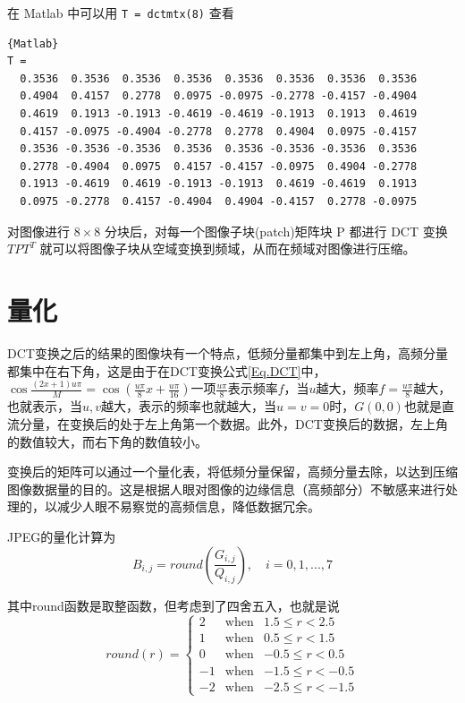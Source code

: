 在 Matlab 中可以用 \lstinline|T = dctmtx(8)| 查看

\begin{lstlisting}{Matlab}
T =
  0.3536  0.3536  0.3536  0.3536  0.3536  0.3536  0.3536  0.3536
  0.4904  0.4157  0.2778  0.0975 -0.0975 -0.2778 -0.4157 -0.4904
  0.4619  0.1913 -0.1913 -0.4619 -0.4619 -0.1913  0.1913  0.4619
  0.4157 -0.0975 -0.4904 -0.2778  0.2778  0.4904  0.0975 -0.4157
  0.3536 -0.3536 -0.3536  0.3536  0.3536 -0.3536 -0.3536  0.3536
  0.2778 -0.4904  0.0975  0.4157 -0.4157 -0.0975  0.4904 -0.2778
  0.1913 -0.4619  0.4619 -0.1913 -0.1913  0.4619 -0.4619  0.1913
  0.0975 -0.2778  0.4157 -0.4904  0.4904 -0.4157  0.2778 -0.0975
\end{lstlisting}

对图像进行 $8\times 8$ 分块后，对每一个图像子块(patch)矩阵块 P 都进行 DCT 变换 $TPT^T$ 就可以将图像子块从空域变换到频域，从而在频域对图像进行压缩。

\section{量化}
DCT变换之后的结果的图像块有一个特点，低频分量都集中到左上角，高频分量都集中在右下角，这是由于在DCT变换公式\ref{Eq.DCT}中，$\cos\frac{(2x+1)u\pi}{M}=\cos(\frac{u\pi}{8}x+\frac{u\pi}{16})$一项$\frac{u\pi}{8}$表示频率$f$，当$u$越大，频率$f=\frac{u\pi}{8}$越大，也就表示，当$u,v$越大，表示的频率也就越大，当$u=v=0$时，$G(0,0)$也就是直流分量，在变换后的处于左上角第一个数据。此外，DCT变换后的数据，左上角的数值较大，而右下角的数值较小。

变换后的矩阵可以通过一个量化表，将低频分量保留，高频分量去除，以达到压缩图像数据量的目的。这是根据人眼对图像的边缘信息（高频部分）不敏感来进行处理的，以减少人眼不易察觉的高频信息，降低数据冗余。

JPEG的量化计算为
\begin{equation}
    B_{i,j}=round(\frac{G_{i,j}}{Q_{i,j}}),\quad i=0,1,...,7
\end{equation}

其中round函数是取整函数，但考虑到了四舍五入，也就是说
\begin{equation}
    round(r)=
    \left\{\begin{array}{rcc}
    2   &\text{when}&  1.5\leq r<2.5 \\
    1   &\text{when}&  0.5\leq r<1.5 \\
    0   &\text{when}& -0.5\leq r<0.5 \\
    -1  &\text{when}& -1.5\leq r<-0.5 \\
    -2  &\text{when}& -2.5\leq r<-1.5
    \end{array}\right.
\end{equation}

